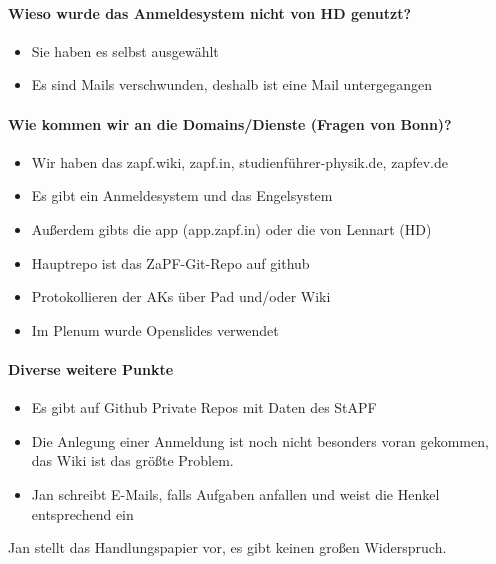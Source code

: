     \paragraph{Wieso wurde das Anmeldesystem nicht von HD genutzt?}
      \begin{itemize}
        \item Sie haben es selbst ausgewählt
        \item Es sind Mails verschwunden, deshalb ist eine Mail untergegangen
      \end{itemize}

    \paragraph{Wie kommen wir an die Domains/Dienste (Fragen von Bonn)?}
      \begin{itemize}
        \item Wir haben das zapf.wiki, zapf.in, studienführer-physik.de, zapfev.de
        \item Es gibt ein Anmeldesystem und das Engelsystem
        \item Außerdem gibts die app (app.zapf.in) oder die von Lennart (HD)
        \item Hauptrepo ist das ZaPF-Git-Repo auf github
        \item Protokollieren der AKs über Pad und/oder Wiki
        \item Im Plenum wurde Openslides verwendet
      \end{itemize}
    \paragraph{Diverse weitere Punkte}
      \begin{itemize}
        \item Es gibt auf Github Private Repos mit Daten des StAPF
        \item Die Anlegung einer Anmeldung ist noch nicht besonders voran gekommen, das Wiki ist das größte Problem.
        \item Jan schreibt E-Mails, falls Aufgaben anfallen und weist die Henkel entsprechend ein
      \end{itemize}
      Jan stellt das Handlungspapier vor, es gibt keinen großen Widerspruch.
